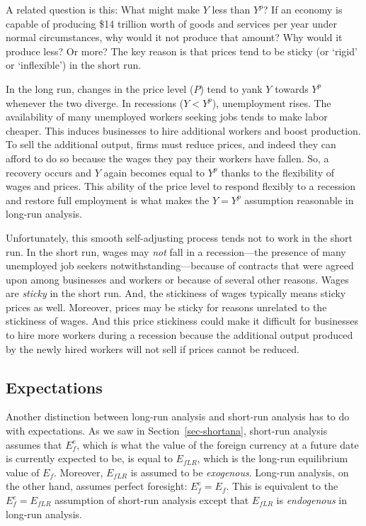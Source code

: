 \documentclass[
  letterpaper,
]{book}
\theoremstyle{plain}
\theoremstyle{remark}
\begin{document}
A related question is this: What might make \(Y\) less than \(Y^p\)? If
an economy is capable of producing \$14 trillion worth of goods and
services per year under normal circumstances, why would it not produce
that amount? Why would it produce less? Or more? The key reason is that
prices tend to be sticky (or `rigid' or `inflexible') in the short run.

In the long run, changes in the price level (\(P\)) tend to yank \(Y\)
towards \(Y^p\) whenever the two diverge. In recessions (\(Y<Y^p\)),
unemployment rises. The availability of many unemployed workers seeking
jobs tends to make labor cheaper. This induces businesses to hire
additional workers and boost production. To sell the additional output,
firms must reduce prices, and indeed they can afford to do so because
the wages they pay their workers have fallen. So, a recovery occurs and
\(Y\) again becomes equal to \(Y^p\) thanks to the flexibility of wages
and prices. This ability of the price level to respond flexibly to a
recession and restore full employment is what makes the \(Y=Y^p\)
assumption reasonable in long-run analysis.

Unfortunately, this smooth self-adjusting process tends not to work in
the short run. In the short run, wages may \emph{not} fall in a
recession---the presence of many unemployed job seekers
notwithstanding---because of contracts that were agreed upon among
businesses and workers or because of several other reasons. Wages are
\emph{sticky} in the short run. And, the stickiness of wages typically
means sticky prices as well. Moreover, prices may be sticky for reasons
unrelated to the stickiness of wages. And this price stickiness could
make it difficult for businesses to hire more workers during a recession
because the additional output produced by the newly hired workers will
not sell if prices cannot be reduced.

\subsection{Expectations}\label{sec-sr-expectations}

Another distinction between long-run analysis and short-run analysis has
to do with expectations. As we saw in Section~\ref{sec-shortana},
short-run analysis assumes that \(E_f^e\), which is what the value of
the foreign currency at a future date is currently expected to be, is
equal to \(E_{fLR}\), which is the long-run equilibrium value of
\(E_f\). Moreover, \(E_{fLR}\) is assumed to be \emph{exogenous}.
Long-run analysis, on the other hand, assumes perfect foresight:
\(E_f^e=E_f\). This is equivalent to the \(E_f^e=E_{fLR}\) assumption of
short-run analysis except that \(E_{fLR}\) is \emph{endogenous} in
long-run analysis.
\end{document}
